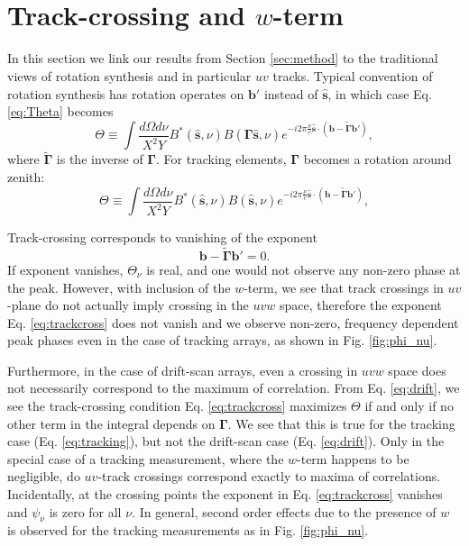 \documentclass[twocolumn,apj,numberedappendix]{emulateapj}
\renewcommand\[{\begin{equation}}
\renewcommand\]{\end{equation}}
\begin{document}
\pagebreak



\appendix
\section{\\Track-crossing and $w$-term \label{sec:appA}}
\label{sec:appA}
In this section we link our results from Section \ref{sec:method} to the traditional views of rotation synthesis and in particular $uv$ tracks. 
Typical convention of rotation synthesis has rotation operates on $\boldsymbol{b'}$ instead of $\hat{\boldsymbol{s}}$, in which case Eq. \eqref{eq:Theta} becomes
\begin{equation}
\Theta \equiv\int\frac{d\Omega d\nu}{X^{2}Y}B^{*}(\hat{\boldsymbol{s}},\nu)B(\boldsymbol{\Gamma}\hat{\boldsymbol{s}},\nu) e^{-i2\pi\frac{\nu}{c}\hat{\boldsymbol{s}}\cdot\left(\boldsymbol{b}-\widetilde{\boldsymbol{\Gamma}}\boldsymbol{b'}\right)}, 
\label{eq:drift}
\end{equation}
where $\widetilde{\boldsymbol{\Gamma}}$ is the inverse of $\boldsymbol{\Gamma}$. 
For tracking elements, $\boldsymbol{\Gamma}$ becomes a rotation around zenith:
\begin{equation}
\Theta \equiv\int\frac{d\Omega d\nu}{X^{2}Y}B^{*}(\hat{\boldsymbol{s}},\nu)B(\hat{\boldsymbol{s}},\nu) e^{-i2\pi\frac{\nu}{c}\hat{\boldsymbol{s}}\cdot\left(\boldsymbol{b}-\widetilde{\boldsymbol{\Gamma}}\boldsymbol{b'}\right)}, 
\label{eq:tracking}
\end{equation}

Track-crossing corresponds to vanishing of the exponent
\[
 \boldsymbol{b}-\widetilde{\boldsymbol{\Gamma}}\boldsymbol{b'} = 0. \label{eq:trackcross}
 \]
If exponent vanishes, $\Theta_{\nu}$ is real, and one would not observe any non-zero phase at the peak. However, with inclusion of the $w$-term, we see that track crossings in $uv$-plane do not actually imply crossing in the $uvw$ space, therefore the exponent Eq. \eqref{eq:trackcross} does not vanish and we observe non-zero, frequency dependent peak phases even in the case of tracking arrays, as shown in Fig. \ref{fig:phi_nu}. 

Furthermore, in the case of drift-scan arrays, even a crossing in $uvw$ space does not necessarily correspond to the maximum of correlation. From Eq. \eqref{eq:drift}, we see the track-crossing condition Eq. \eqref{eq:trackcross} maximizes $\Theta$ if and only if no other term in the integral depends on $\boldsymbol{\Gamma}$. We see that this is true for the tracking case (Eq. \eqref{eq:tracking}), but not the drift-scan case (Eq. \eqref{eq:drift}). Only in the special case of a tracking measurement, where the $w$-term happens to be negligible, do $uv$-track crossings correspond exactly to maxima of correlations. Incidentally, at the crossing points the exponent in Eq. \eqref{eq:trackcross} vanishes and $\psi_\nu$ is zero for all $\nu$. In general, second order effects due to the presence of $w$ is observed for the tracking measurements as in Fig. \ref{fig:phi_nu}. 
\end{document}
